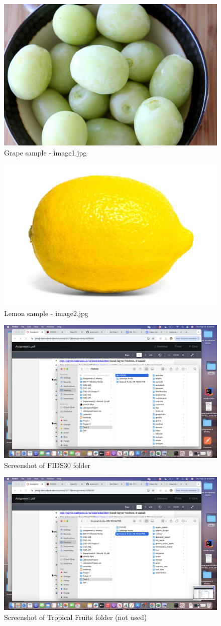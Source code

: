 \documentclass[conference]{IEEEtran} %
\begin{document}
\begin{figure}[H]
    \centering
    \includegraphics[width=0.5\linewidth]{image1.jpg}
    \caption{Grape sample - image1.jpg}
    \label{fig:image1}
\end{figure}

\begin{figure}[H]
    \centering
    \includegraphics[width=0.5\linewidth]{image2.jpg}
    \caption{Lemon sample - image2.jpg}
    \label{fig:image2}
\end{figure}

\begin{figure}[H]
    \centering
    \includegraphics[width=0.5\linewidth]{datafolder.png}
    \caption{Screenshot of FIDS30 folder}
    \label{fig:screenshot1}
\end{figure}

\begin{figure}[H]
    \centering
    \includegraphics[width=0.5\linewidth]{datafolder2.png}
    \caption{Screenshot of Tropical Fruits folder (not used)}
    \label{fig:screenshot2}
\end{figure}
\end{document}
